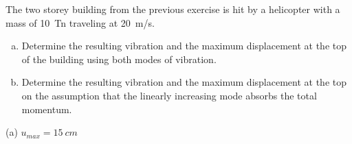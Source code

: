 
\begin{Exercise}[label={two_storey_helicopter}]
The two storey building from the previous exercise is hit by a helicopter with a mass of \qty{10}{Tn} traveling at \qty{20}{m/s}.
\begin{enumerate}[(a)]
    \item Determine the resulting vibration and the maximum displacement at the top of the building using both modes of vibration.
    \item Determine the resulting vibration and the maximum displacement at the top on the assumption that the linearly increasing mode absorbs the total momentum.
\end{enumerate}
\shortAnswer (a) $u_{max} = \SI{15}{cm}$
\end{Exercise}



